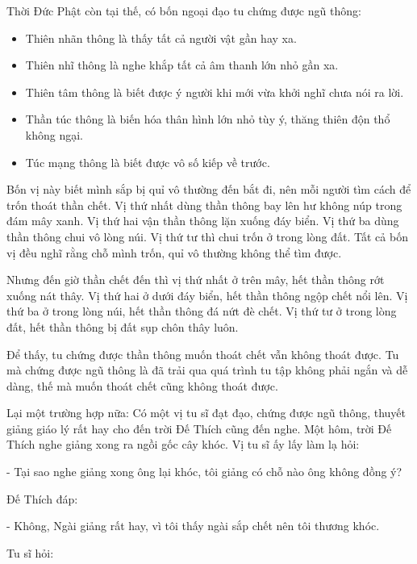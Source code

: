 \documentclass[
  12pt,
  oneside]{book}
\providecommand{\tightlist}{%
  \setlength{\itemsep}{0pt}\setlength{\parskip}{0pt}}
\begin{document}
Thời Đức Phật còn tại thế, có bốn ngoại đạo tu chứng được ngũ thông:

\begin{itemize}
\tightlist
\item
  Thiên nhãn thông là thấy tất cả người vật gần hay xa.\\
\item
  Thiên nhĩ thông là nghe khắp tất cả âm thanh lớn nhỏ gần xa.\\
\item
  Thiên tâm thông là biết được ý người khi mới vừa khởi nghĩ chưa nói ra lời.\\
\item
  Thần túc thông là biến hóa thân hình lớn nhỏ tùy ý, thăng thiên độn thổ không ngại.\\
\item
  Túc mạng thông là biết được vô số kiếp về trước.
\end{itemize}

Bốn vị này biết mình sắp bị quỉ vô thường đến bắt đi, nên mỗi người tìm cách để trốn thoát thần chết. Vị thứ nhất dùng thần thông bay lên hư không núp trong đám mây xanh. Vị thứ hai vận thần thông lặn xuống đáy biển. Vị thứ ba dùng thần thông chui vô lòng núi. Vị thứ tư thì chui trốn ở trong lòng đất. Tất cả bốn vị đều nghĩ rằng chỗ mình trốn, quỉ vô thường không thể tìm được.

Nhưng đến giờ thần chết đến thì vị thứ nhất ở trên mây, hết thần thông rớt xuống nát thây. Vị thứ hai ở dưới đáy biển, hết thần thông ngộp chết nổi lên. Vị thứ ba ở trong lòng núi, hết thần thông đá nứt đè chết. Vị thứ tư ở trong lòng đất, hết thần thông bị đất sụp chôn thây luôn.

Để thấy, tu chứng được thần thông muốn thoát chết vẫn không thoát được. Tu mà chứng được ngũ thông là đã trải qua quá trình tu tập không phải ngắn và dễ dàng, thế mà muốn thoát chết cũng không thoát được.

Lại một trường hợp nữa: Có một vị tu sĩ đạt đạo, chứng được ngũ thông, thuyết giảng giáo lý rất hay cho đến trời Đế Thích cũng đến nghe. Một hôm, trời Đế Thích nghe giảng xong ra ngồi gốc cây khóc. Vị tu sĩ ấy lấy làm lạ hỏi:

- Tại sao nghe giảng xong ông lại khóc, tôi giảng có chỗ nào ông không đồng ý?

Đế Thích đáp:

- Không, Ngài giảng rất hay, vì tôi thấy ngài sắp chết nên tôi thương khóc.

Tu sĩ hỏi:
\end{document}
